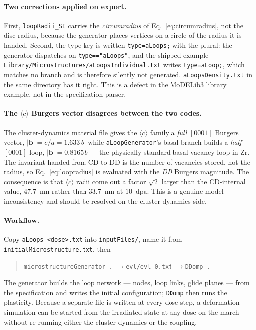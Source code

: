 \documentclass[11pt,a4paper]{article}
\newcommand{\code}[1]{\texttt{\small #1}}
\newcommand{\dpa}{\ensuremath{\mathrm{dpa}}}
\newcommand{\cloop}{\ensuremath{\langle c\rangle}}
\begin{document}
\paragraph{Two corrections applied on export.} First, \code{loopRadii\_SI}
carries the \emph{circumradius} of Eq.~\eqref{eq:circumradius}, not the disc
radius, because the generator places vertices on a circle of the radius it is
handed. Second, the type key is written \code{type=aLoops;} with the plural: the
generator dispatches on \code{type=="aLoops"}, and the shipped example
\code{Library/Microstructures/aLoopsIndividual.txt} writes \code{type=aLoop;},
which matches no branch and is therefore silently not generated.
\code{aLoopsDensity.txt} in the same directory has it right. This is a defect in
the MoDELib3 library example, not in the specification parser.

\paragraph{The \cloop{} Burgers vector disagrees between the two codes.} The
cluster-dynamics material file gives the \cloop{} family a \emph{full}
$[0001]$ Burgers vector, $|\mathbf{b}| = c/a = 1.633\,b$, while
\code{aLoopGenerator}'s basal branch builds a \emph{half} $[0001]$ loop,
$|\mathbf{b}| = 0.8165\,b$ --- the physically standard basal vacancy loop in Zr.
The invariant handed from CD to DD is the number of vacancies stored, not the
radius, so Eq.~\eqref{eq:loopradius} is evaluated with the \emph{DD} Burgers
magnitude. The consequence is that \cloop{} radii come out a factor $\sqrt{2}$
larger than the CD-internal value, $47.7$~nm rather than $33.7$~nm at
$10$~\dpa. This is a genuine model inconsistency and should be resolved on the
cluster-dynamics side.

\paragraph{Workflow.} Copy \code{aLoops\_<dose>.txt} into \code{inputFiles/},
name it from \code{initialMicrostructure.txt}, then
\begin{quote}\small
\code{microstructureGenerator .} \quad$\rightarrow$\quad \code{evl/evl\_0.txt}
\quad$\rightarrow$\quad \code{DDomp .}
\end{quote}
The generator builds the loop network --- nodes, loop links, glide planes ---
from the specification and writes the initial configuration; \code{DDomp} then
runs the plasticity. Because a separate file is written at every dose step, a
deformation simulation can be started from the irradiated state at any dose on
the march without re-running either the cluster dynamics or the coupling.
\end{document}
